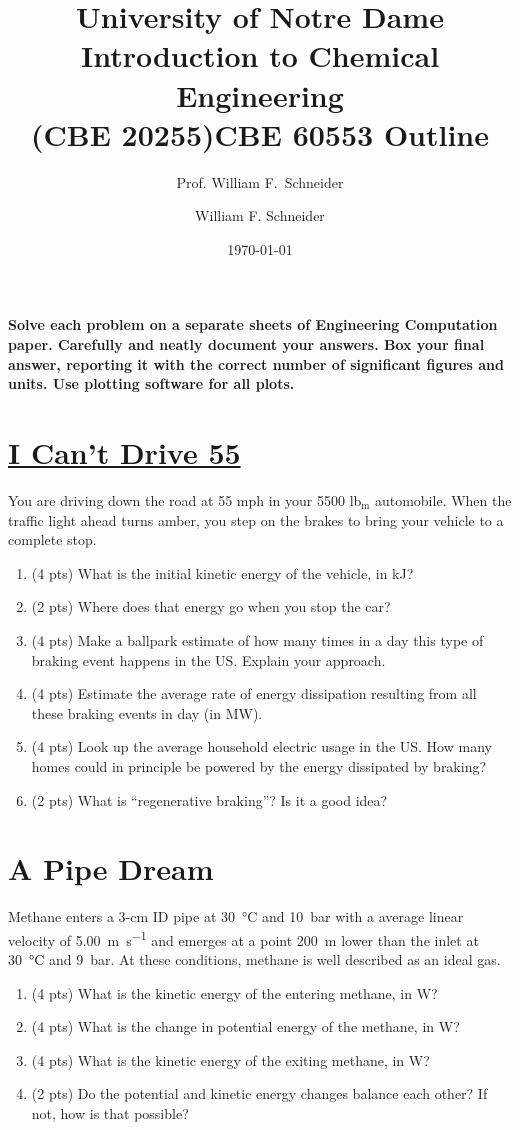 \documentclass[11pt]{article}
\title{University of Notre Dame\\Introduction to Chemical Engineering\\(CBE 20255)}
\author{Prof. William F.\ Schneider}
\author{William F. Schneider}
\date{\today}
\title{CBE 60553 Outline}
\begin{document}
\begin{options}
\end{options}

\noindent \textbf{Solve each problem on a separate sheets of Engineering Computation paper.  Carefully and neatly document your answers. Box your final answer, reporting it with the correct number of significant figures and units.  Use plotting software for all plots.}

\section{\href{https://www.youtube.com/watch?v=RvV3nn_de2k}{I Can't Drive 55}}
\label{sec-1}
You are driving down the road at 55 mph in your 5500 lb$_{\text{m}}$ automobile.  When the traffic light ahead turns amber, you step on the brakes to bring your vehicle to a complete stop.

\begin{enumerate}
\item (4 pts) What is the initial kinetic energy of the vehicle, in kJ?
\item (2 pts) Where does that energy go when you stop the car?
\item (4 pts) Make a ballpark estimate of how many times in a day this type of braking event happens in the US. Explain your approach.
\item (4 pts) Estimate the average rate of energy dissipation resulting from all these braking events in day (in MW).
\item (4 pts) Look up the average household electric usage in the US.  How many homes could in principle be powered by the energy dissipated by braking?
\item (2 pts) What is ``regenerative braking''?  Is it a good idea?
\end{enumerate}

\section{A Pipe Dream}
\label{sec-2}
Methane enters a 3-cm ID pipe at \SI{30}{\celsius} and \SI{10}{\bar} with a average linear velocity of \SI{5.00}{\meter\per\second} and emerges at a point \SI{200}{\meter} lower than the inlet at \SI{30}{\celsius} and \SI{9}{\bar}. At these conditions, methane is well described as an ideal gas.

\begin{enumerate}
\item (4 pts) What is the kinetic energy of the entering methane, in W?
\item (4 pts) What is the change in potential energy of the methane, in W?
\item (4 pts) What is the kinetic energy of the exiting methane, in W?
\item (2 pts) Do the potential and kinetic energy changes balance each other?  If not, how is that possible?
\end{enumerate}
\end{document}
